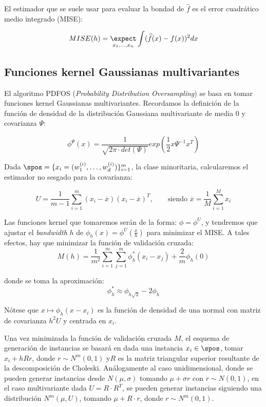 El estimador que se suele usar para evaluar la bondad de $\widehat{f}$ es el error cuadrático medio integrado (MISE):

\[MISE(h) = \underset{x_1, \ldots, x_n}{\expect} \int (\widehat{f}(x) - f(x))^2 dx\]



\subsection{Funciones kernel Gaussianas multivariantes}
El algoritmo PDFOS (\textit{Probability Distribution Oversampling}) se basa en tomar funciones kernel Gaussianas multivariantes.
Recordamos la definición de la función de densidad de la distribución Gaussiana multivariante de media $0$ y covarianza $\Psi$:

\[\phi^{\Psi}(x) = \frac{1}{\sqrt{2\pi \cdot det(\Psi)}} exp\left(\frac{1}{2} x \Psi^{-1} x^T \right)\]

Dada $\spos = \{x_i = (w_1^{(i)}, \ldots, w_d^{(i)})\}_{i=1}^m$, la clase minoritaria, calcularemos el estimador no sesgado 
para la covarianza:

\[U = \frac{1}{m-1} \sum_{i=1}^m (x_i - \overline{x})(x_i - \overline{x})^T, 
  \qquad \textrm{siendo } \overline{x} = \frac{1}{M}\sum_{i=1}^M x_i\]
  
Las funciones kernel que tomaremos serán de la forma: $\phi = \phi^{U}$, y tendremos que ajustar el \textit{bandwidth} $h$ de
$\phi_h(x) = \phi^U\left(\frac{x}{h}\right)$ para minimizar el MISE. A tales efectos, hay que minimizar la función de validación
cruzada:
\[M(h) = \frac{1}{m^2} \sum_{i=1}^m \sum_{j=1}^m \phi_h^{\ast} (x_i - x_j) + \frac{2}{m} \phi_h(0)\]

donde se toma la aproximación:
\[\phi_h^{\ast} \approx \phi_{h\sqrt{2}} - 2\phi_h\]

Nótese que $x\mapsto \phi_h(x-x_i)$ es la función de densidad de una normal con matriz de covarianza $h^2 U$ y centrada en $x_i$.

Una vez minimizada la función de validación cruzada $M$, el esquema de generación de instancias se basará en dada una instancia
$x_i \in \spos$, tomar $x_i + h R r$, donde $r\sim N^m(0,1)$ y$R$ es la matriz triangular superior resultante de la descomposición
de Choleski. Análogamente al caso unidimensional, donde se pueden generar instancias desde $N(\mu, \sigma)$ tomando $\mu + \sigma r$
con $r\sim N(0,1)$, en el caso multivariante dada $U =  R \cdot R^T$, se pueden generar instancias siguiendo una distribución $N^m(\mu, U)$,
tomando $\mu + R \cdot r$, donde $r\sim N^m(0,1)$.

